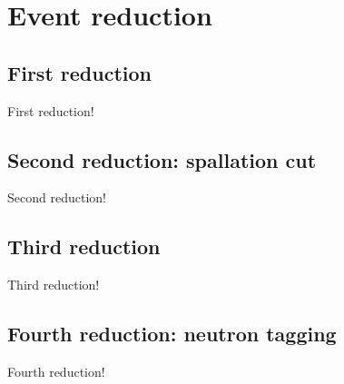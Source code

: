 
%
%

\section{Event reduction}\label{Section_EventRedu}

\subsection{First reduction}
\vs\hs First reduction!

\subsection{Second reduction: spallation cut}
\vs\hs Second reduction!

\subsection{Third reduction}
\vs\hs Third reduction!

\subsection{Fourth reduction: neutron tagging}
\vs\hs Fourth reduction!

\newpage

